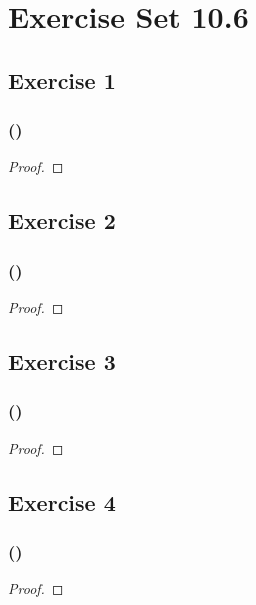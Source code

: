 \documentclass[14pt]{extarticle}
\begin{document}
\section{Exercise Set 10.6}
\subsection{Exercise 1}

\subsubsection{()}

\begin{proof}

\end{proof}

\subsection{Exercise 2}

\subsubsection{()}

\begin{proof}

\end{proof}

\subsection{Exercise 3}

\subsubsection{()}

\begin{proof}

\end{proof}

\subsection{Exercise 4}

\subsubsection{()}

\begin{proof}

\end{proof}
\end{document}
